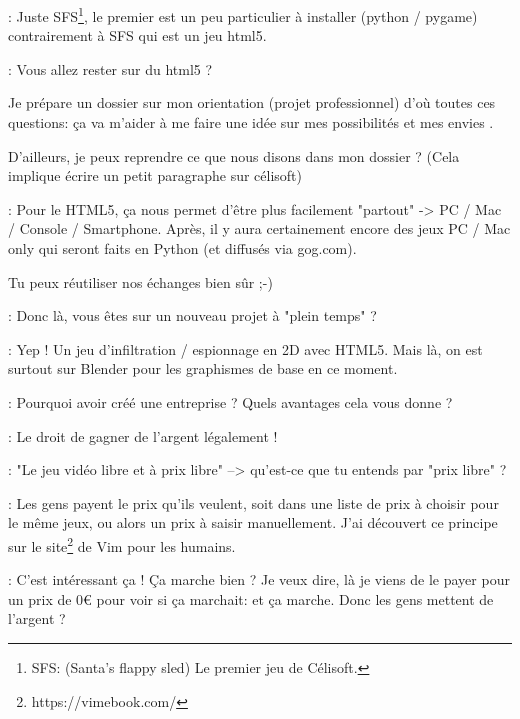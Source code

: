\documentclass[a4paper,12pt, draft]{report}
\begin{document}
\begin{description}
\item 
\item [Réponse]: Juste SFS\footnote{\textsc{SFS}: (Santa's flappy sled) Le premier jeu de Célisoft.}, le premier est un peu particulier à installer (python / pygame) contrairement à SFS qui est un jeu html5.
\item 
\item [Question]: Vous allez rester sur du html5 ?
\item Je prépare un dossier sur mon orientation (projet professionnel) d'où toutes ces questions: ça va m'aider à me faire une idée sur mes possibilités et mes envies  .
\item D'ailleurs, je peux reprendre ce que nous disons dans mon dossier ? (Cela implique écrire un petit paragraphe sur célisoft)
\item 
\item [Réponse]: Pour le HTML5, ça nous permet d'être plus facilement "partout" -> PC / Mac / Console / Smartphone. Après, il y aura certainement encore des jeux PC / Mac only qui seront faits en Python (et diffusés via gog.com).
\item Tu peux réutiliser nos échanges bien sûr ;-)
\item 
\item [Question]: Donc là, vous êtes sur un nouveau projet à "plein temps" ?
\item 
\item [Réponse]: Yep ! Un jeu d'infiltration / espionnage en 2D avec HTML5. Mais là, on est surtout sur Blender pour les graphismes de base en ce moment.
\item 
\item [Question]: Pourquoi avoir créé une entreprise ? Quels avantages cela vous donne ?
\item 
\item [Réponse]: Le droit de gagner de l'argent légalement !
\item 
\item [Question]: "Le jeu vidéo libre et à prix libre" --> qu'est-ce que tu entends par "prix libre" ?  
\item 
\item [Réponse]: Les gens payent le prix qu'ils veulent, soit dans une liste de prix à choisir pour le même jeux, ou alors un prix à saisir manuellement. J'ai découvert ce principe sur le site\footnote{https://vimebook.com/} de Vim pour les humains.
\item 
\item [Question]: C'est intéressant ça ! Ça marche bien ? Je veux dire, là je viens de le payer pour un prix de 0€ pour voir si ça marchait: et ça marche. Donc les gens mettent de l'argent ?

\end{description}
\end{document}
